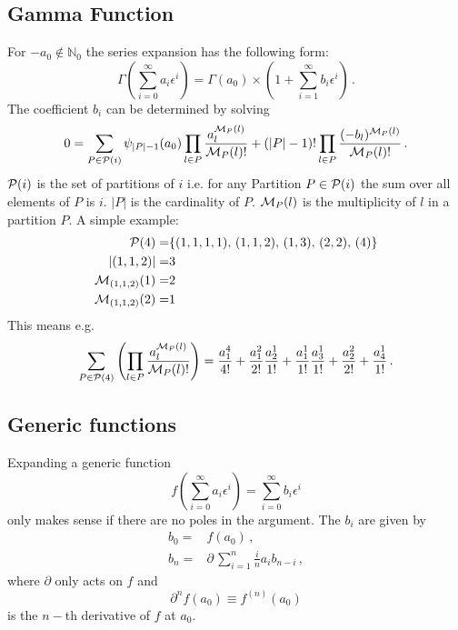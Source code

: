 \documentclass[titlepage]{article}
\begin{document}
\subsection{Gamma Function}
\label{sec:impl_gamma}

For $-a_0 \notin \mathbb{N}_0$ the series expansion has the following
form:
\begin{equation}
  \label{eq:gamma}
  \Gamma\left(\sum_{i=0}^\infty a_i\epsilon^i\right) =
  \Gamma(a_0)\times\left(1+\sum_{i=1}^\infty b_i\epsilon^i\right)\,.
\end{equation}
The coefficient $b_i$ can be determined by solving
\begin{equation}
  \label{eq:gamma_rec}
  0 = \sum_{P \in \mathcal{P}(i)} \psi_{|P|-1}(a_0)\prod_{l\in
    P}\frac{a_l^{{\cal M}_P(l)}}{{\cal M}_P(l)!}
+ (|P|-1)!\*\prod_{l \in P}\frac{(-b_l)^{{\cal M}_P(l)}}{{\cal M}_P(l)!}\,.
\end{equation}
${\cal P}(i)$ is the set of partitions of $i$ i.e. for any
Partition $P \in {\cal P}(i)$ the sum over all elements of $P$ is
$i$. $|P|$ is the cardinality of $P$.
${\cal M}_P(l)$ is the multiplicity of $l$ in a partition $P$. A simple
example:
\begin{align*}
  {\cal P}(4)=&\{(1,1,1,1),\,(1,1,2),\,(1,3),\,(2,2),\,(4)\}\\
  |(1,1,2)|=&3\\
  {\cal M}_{(1,1,2)}(1)=&2\\
  {\cal M}_{(1,1,2)}(2)=&1\\
\end{align*}
This means e.g.
\begin{equation}
  \label{eq:exp_ex}
\sum_{P \in {\cal P}(4)} \left(\prod_{l \in P} \frac{a^{{\cal M}_P(l)}_l}{{\cal M}_P(l)!} \right)=
  \frac{a_1^4}{4!}+\frac{a_1^2}{2!}\frac{a_2^1}{1!}+\frac{a_1^1}{1!}\frac{a_3^1}{1!}+\frac{a_2^2}{2!}+\frac{a_4^1}{1!}\,.
\end{equation}


\subsection{Generic functions}
\label{sec:generic_fun}

Expanding a generic function
\begin{equation}
  \label{eq:generic_fun}
  f\left(\sum_{i=0}^{\infty}a_i
    \epsilon^i\right)=\sum_{i=0}^{\infty}b_i
    \epsilon^i
\end{equation}
only makes sense if there are no poles in the argument.
The $b_i$ are given by
\begin{align}
  \label{eq:generic_rec}
  b_0=&f(a_0)\,,\\
  b_n=&\partial\,\sum_{i=1}^{n}\frac{i}{n} a_{i}b_{n-i} \,,
\end{align}
where $\partial$ only acts on $f$ and
\begin{equation}
  \label{eq:partial}
  \partial^n f(a_0) \equiv f^{(n)}(a_0)
\end{equation}
is the $n-$th derivative of $f$ at $a_0$.
\end{document}
